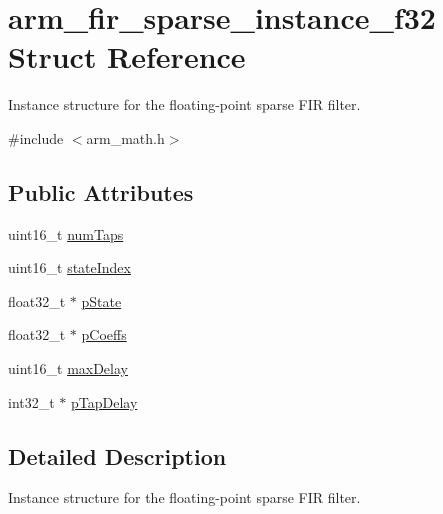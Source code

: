 \hypertarget{structarm__fir__sparse__instance__f32}{\section{arm\-\_\-fir\-\_\-sparse\-\_\-instance\-\_\-f32 Struct Reference}
\label{structarm__fir__sparse__instance__f32}
}


Instance structure for the floating-\/point sparse F\-I\-R filter.  




{\ttfamily \#include $<$arm\-\_\-math.\-h$>$}

\subsection*{Public Attributes}
\begin{DoxyCompactItemize}
\item 
uint16\-\_\-t \hyperlink{structarm__fir__sparse__instance__f32_a5e19e7f234ac30a3db843352bf2a8515}{num\-Taps}
\item 
uint16\-\_\-t \hyperlink{structarm__fir__sparse__instance__f32_a57585aeca9dc8686e08df2865375a86d}{state\-Index}
\item 
float32\-\_\-t $\ast$ \hyperlink{structarm__fir__sparse__instance__f32_a794af0916666d11cc564d6df08553555}{p\-State}
\item 
float32\-\_\-t $\ast$ \hyperlink{structarm__fir__sparse__instance__f32_a04af7c738dfb0882ad102fcad501d94a}{p\-Coeffs}
\item 
uint16\-\_\-t \hyperlink{structarm__fir__sparse__instance__f32_af8b8c775f4084c36774f06c082b4c078}{max\-Delay}
\item 
int32\-\_\-t $\ast$ \hyperlink{structarm__fir__sparse__instance__f32_aaa54ae67e5d10c6dd0d697945c638d31}{p\-Tap\-Delay}
\end{DoxyCompactItemize}


\subsection{Detailed Description}
Instance structure for the floating-\/point sparse F\-I\-R filter. 

